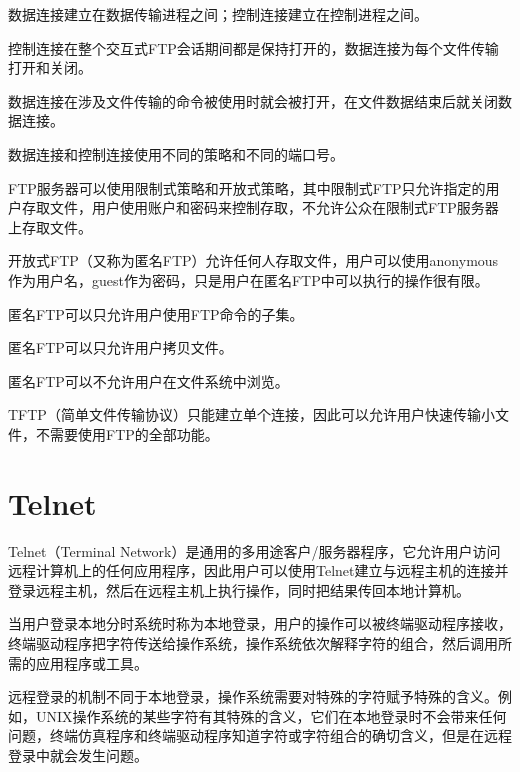 \begin{compactitem}
\item 数据连接建立在数据传输进程之间；控制连接建立在控制进程之间。
\item 控制连接在整个交互式FTP会话期间都是保持打开的，数据连接为每个文件传输打开和关闭。
\item 数据连接在涉及文件传输的命令被使用时就会被打开，在文件数据结束后就关闭数据连接。
\item 数据连接和控制连接使用不同的策略和不同的端口号。
\end{compactitem}

FTP服务器可以使用限制式策略和开放式策略，其中限制式FTP只允许指定的用户存取文件，用户使用账户和密码来控制存取，不允许公众在限制式FTP服务器上存取文件。

开放式FTP（又称为匿名FTP）允许任何人存取文件，用户可以使用anonymous作为用户名，guest作为密码，只是用户在匿名FTP中可以执行的操作很有限。

\begin{compactitem}
\item 匿名FTP可以只允许用户使用FTP命令的子集。
\item 匿名FTP可以只允许用户拷贝文件。
\item 匿名FTP可以不允许用户在文件系统中浏览。
\end{compactitem}




TFTP（简单文件传输协议）只能建立单个连接，因此可以允许用户快速传输小文件，不需要使用FTP的全部功能。








\chapter{Telnet}



Telnet（Terminal Network）是通用的多用途客户/服务器程序，它允许用户访问远程计算机上的任何应用程序，因此用户可以使用Telnet建立与远程主机的连接并登录远程主机，然后在远程主机上执行操作，同时把结果传回本地计算机。


当用户登录本地分时系统时称为本地登录，用户的操作可以被终端驱动程序接收，终端驱动程序把字符传送给操作系统，操作系统依次解释字符的组合，然后调用所需的应用程序或工具。

远程登录的机制不同于本地登录，操作系统需要对特殊的字符赋予特殊的含义。例如，UNIX操作系统的某些字符有其特殊的含义，它们在本地登录时不会带来任何问题，终端仿真程序和终端驱动程序知道字符或字符组合的确切含义，但是在远程登录中就会发生问题。

